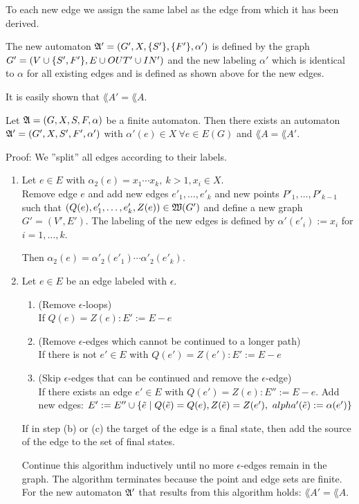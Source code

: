 To each new edge we assign the same label as the edge from which it has been
derived.

The new automaton $\mbox{$\mathfrak{A'}$} = (G', X, \mbox{$\{S'\}$}, \mbox{$\{F'\}$}, \alpha')$ is
defined by the graph $G' = (V \cup \mbox{$\{S', F'\}$}, E \cup OUT' \cup IN')$
and the new labeling $\alpha'$ which is identical to $\alpha$ for all existing 
edges and is defined as shown above for the new edges.

It is easily shown that $\lang{A'} = \lang{A}$.

\begin{lemma}
Let $\mbox{$\mathfrak{A}$} = (G, X, S, F, \alpha)$ be a finite automaton. Then there
exists an automaton $\mbox{$\mathfrak{A'}$} = (G', X, S', F', \alpha')$ with $\alpha'(e)
\in X\ \forall e \in E(G)$ and $\lang{A} = \lang{A'}$.
\end{lemma}

Proof: We ''split'' all edges according to their labels.

\begin{enumerate}
  \item Let $e \in E$ with $\alpha_2(e) = x_1 \cdots x_k,\ k > 1, x_i \in X$.\\
  Remove edge $e$ and add new edges $e'_1,
  \ldots, e'_k$ and new points $P'_1, \ldots, P'_{k-1}$ such that $(Q(e),
  e'_1, \ldots, e'_k, Z(e)) \in \mbox{$\mathfrak{W}(G')$}$ and define a new graph $G' =
  (V', E')$. The labeling of the new edges is defined by $\alpha'(e'_i) := x_i$
  for $i = 1, \ldots, k$.
  
  Then $\alpha_2(e) = \alpha'_2(e'_1) \cdots \alpha'_2(e'_k)$.
  
  \item Let $e \in E$ be an edge labeled with $\epsilon$.
  \begin{enumerate}
    \item  (Remove $\epsilon$-loops) \\
    If $Q(e) = Z(e) : E' := E - e$
    \item (Remove
    $\epsilon$-edges which cannot be continued to a longer path)\\
    If there is
    not $e' \in E$ with $Q(e') = Z(e') : E' := E - e$
    \item  (Skip $\epsilon$-edges that can be continued and remove the
    $\epsilon$-edge)\\
    If there exists an edge $e' \in E$ with $Q(e') = Z(e) : E'' := E - e$.
    Add new edges: $E' := E'' \cup \mbox{$\{\tilde{e} \mid Q(\tilde{e}) = Q(e), 
    Z(\tilde{e}) = Z(e'),\ alpha'(\tilde{e}) := \alpha(e')\}$}$
  \end{enumerate}
  If in step (b) or (c) the target of the edge is a final state, then add the
  source of the edge to the set of final states.
  
  Continue this algorithm inductively until no more $\epsilon$-edges remain in
  the graph. The algorithm terminates because the point and edge sets are
  finite. For the new automaton $\mbox{$\mathfrak{A'}$}$ that results from this algorithm
  holds: $\lang{A'} = \lang{A}$.
\end{enumerate}

